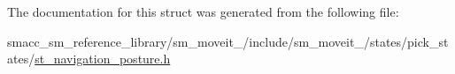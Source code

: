 The documentation for this struct was generated from the following file\+:\begin{DoxyCompactItemize}
\item 
smacc\+\_\+sm\+\_\+reference\+\_\+library/sm\+\_\+moveit\+\_/include/sm\+\_\+moveit\+\_/states/pick\+\_\+states/\hyperlink{3_2include_2sm__moveit__3_2states_2pick__states_2st__navigation__posture_8h}{st\+\_\+navigation\+\_\+posture.\+h}\end{DoxyCompactItemize}
